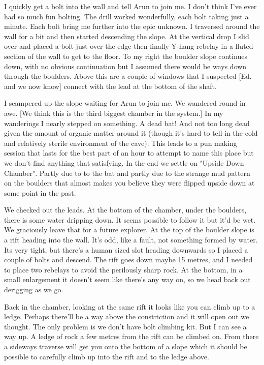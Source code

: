 I quickly get a bolt into the wall and tell Arun to join me. I don't think I've ever had so much fun bolting. The drill worked wonderfully, each bolt taking just a minute. Each bolt bring me further into the epic unknown. I traversed around the wall for a bit and then started descending the slope. At the vertical drop I slid over and placed a bolt just over the edge then finally Y-hang rebelay in a fluted section of the wall to get to the floor. To my right the boulder slope continues down, with no obvious continuation but I assumed there would be ways down through the boulders. Above this are a couple of windows that I suspected [Ed. and we now know] connect with the lead at the bottom of the shaft.

I scampered up the slope waiting for Arun to join me. We wandered round in awe. [We think this is the third biggest chamber in the system.] In my wanderings I nearly stepped on something. A dead bat! And not too long dead given the amount of organic matter around it (though it's hard to tell in the cold and relatively sterile environment of the cave). This leads to a pun making session that lasts for the best part of an hour to attempt to name this place but we don't find anything that satisfying. In the end we settle on "Upside Down Chamber". Partly due to to the bat and partly due to the strange mud pattern on the boulders that almost makes you believe they were flipped upside down at some point in the past.

We checked out the leads. At the bottom of the chamber, under the boulders, there is some water dripping down. It seems possible to follow it but it'd be wet. We graciously leave that for a future explorer. At the top of the boulder slope is a rift heading into the wall. It's odd, like a fault, not something formed by water. Its very tight, but there's a human sized slot heading downwards so I placed a couple of bolts and descend. The rift goes down maybe 15 metres, and I needed to place two rebelays to avoid the perilously sharp rock. At the bottom, in a small enlargement it doesn't seem like there's any way on, so we head back out derigging as we go. 

Back in the chamber, looking at the same rift it looks like you can climb up to a ledge. Perhaps there'll be a way above the constriction and it will open out we thought. The only problem is we don't have bolt climbing kit. But I can see a way up. A ledge of rock a few metres from the rift can be climbed on. From there a sideways traverse will get you onto the bottom of a slope which it should be possible to carefully climb up into the rift and to the ledge above. 

